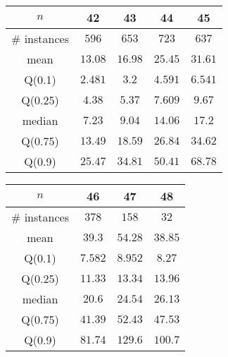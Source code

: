 \begin{tabular}{c|cccc} 
\hline 
$n$ & 42 & 43 & 44 & 45 \tabularnewline 
\hline 
\hline 
\# instances & $596$ & $653$ & $723$ & $637$ \tabularnewline 
mean & $13.08$ & $16.98$ & $25.45$ & $31.61$ \tabularnewline 
Q(0.1) & $2.481$ & $3.2$ & $4.591$ & $6.541$ \tabularnewline 
Q(0.25) & $4.38$ & $5.37$ & $7.609$ & $9.67$ \tabularnewline 
median & $7.23$ & $9.04$ & $14.06$ & $17.2$ \tabularnewline 
Q(0.75) & $13.49$ & $18.59$ & $26.84$ & $34.62$ \tabularnewline 
Q(0.9) & $25.47$ & $34.81$ & $50.41$ & $68.78$ \tabularnewline 
\hline 
\end{tabular} 
\medskip{} 

\begin{tabular}{c|ccc} 
\hline 
$n$ & 46 & 47 & 48 \tabularnewline 
\hline 
\hline 
\# instances & $378$ & $158$ & $32$ \tabularnewline 
mean & $39.3$ & $54.28$ & $38.85$ \tabularnewline 
Q(0.1) & $7.582$ & $8.952$ & $8.27$ \tabularnewline 
Q(0.25) & $11.33$ & $13.34$ & $13.96$ \tabularnewline 
median & $20.6$ & $24.54$ & $26.13$ \tabularnewline 
Q(0.75) & $41.39$ & $52.43$ & $47.53$ \tabularnewline 
Q(0.9) & $81.74$ & $129.6$ & $100.7$ \tabularnewline 
\hline 
\end{tabular} 
\medskip{} 

